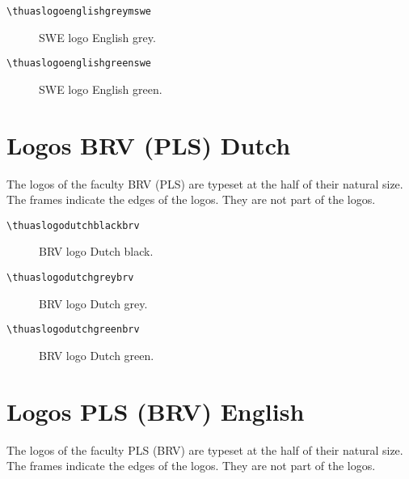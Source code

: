 \documentclass[a4paper,12pt]{article}
\begin{document}
\begin{verbatim}
\thuaslogoenglishgreymswe
\end{verbatim}

\begin{figure}[H]
\centering\fboxsep=0pt%
\fbox{%
\scalebox{0.7071}{\thuaslogoenglishgreyswe}}
\caption{SWE logo English grey.}
\end{figure}

\begin{verbatim}
\thuaslogoenglishgreenswe
\end{verbatim}

\begin{figure}[H]
\centering\fboxsep=0pt%
\fbox{%
\scalebox{0.7071}{\thuaslogoenglishgreenswe}}
\caption{SWE logo English green.}
\end{figure}


\section{Logos BRV (PLS) Dutch}
The logos of the faculty BRV (PLS) are typeset at the half of their natural size.
The frames indicate the edges of the logos. They are not part of the logos.

\begin{verbatim}
\thuaslogodutchblackbrv
\end{verbatim}

\begin{figure}[H]
\centering\fboxsep=0pt%
\fbox{%
\scalebox{0.7071}{\thuaslogodutchblackbrv}}
\caption{BRV logo Dutch black.}
\end{figure}

\begin{verbatim}
\thuaslogodutchgreybrv
\end{verbatim}

\begin{figure}[H]
\centering\fboxsep=0pt%
\fbox{%
\scalebox{0.7071}{\thuaslogodutchgreybrv}}
\caption{BRV logo Dutch grey.}
\end{figure}

\begin{verbatim}
\thuaslogodutchgreenbrv
\end{verbatim}

\begin{figure}[H]
\centering\fboxsep=0pt%
\fbox{%
\scalebox{0.7071}{\thuaslogodutchgreenbrv}}
\caption{BRV logo Dutch green.}
\end{figure}


\section{Logos PLS (BRV) English}
The logos of the faculty PLS (BRV) are typeset at the half of their natural size.
The frames indicate the edges of the logos. They are not part of the logos.
\end{document}
